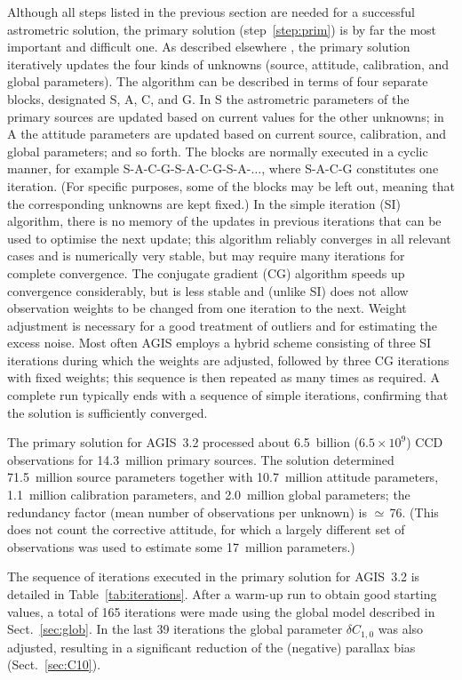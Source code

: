 \documentclass[longauth]{aa} %
\begin{document}
Although all steps listed in the previous section are needed for a successful 
astrometric solution, the primary solution (step~\ref{step:prim}) is by far the most 
important and difficult one. As described elsewhere
, the primary solution iteratively updates the four
kinds of unknowns (source, attitude, calibration, and global parameters). The algorithm
can be described in terms of four separate blocks, designated S, A, C, and G.
In S the astrometric parameters of the primary sources are updated based on current 
values for the other unknowns; in A the attitude parameters are updated based on
current source, calibration, and global parameters; and so forth. The blocks are
normally executed in a cyclic manner, for example S-A-C-G-S-A-C-G-S-A-$\dots$, 
where S-A-C-G constitutes one iteration. (For specific purposes, some of the blocks 
may be left out, meaning that the corresponding unknowns are kept fixed.)
In the simple iteration (SI) algorithm, there is no memory of the updates in previous
iterations that can be used to optimise the next update; this algorithm 
reliably converges in all relevant cases
and is numerically very stable, but may require many iterations for complete convergence. 
The conjugate gradient (CG) algorithm  speeds up 
convergence considerably, but is less stable and (unlike SI) does not allow observation 
weights to be changed from one iteration to the next. Weight adjustment is necessary 
for a good treatment of outliers and for estimating the excess noise. Most often
AGIS employs a hybrid scheme consisting of three SI iterations during which the weights 
are adjusted, followed by three CG iterations with fixed weights; this sequence is 
then repeated as many times as required. A complete run typically ends with a 
sequence of simple iterations, confirming that the solution is sufficiently converged.

The primary solution for AGIS~3.2 processed about 6.5~billion ($6.5\times 10^9$) 
CCD observations for 14.3~million primary sources. The solution determined 
71.5~million source parameters together with 10.7~million attitude parameters, 
1.1~million calibration parameters, and 2.0~million global parameters; the redundancy 
factor (mean number of observations per unknown) is $\simeq\,$76.
(This does not count the corrective attitude, for which a largely different set of
observations was used to estimate some 17~million parameters.)

The sequence of iterations executed in the primary solution for AGIS~3.2 is 
detailed in Table~\ref{tab:iterations}. After a warm-up run to obtain good starting
values, a total of 165 iterations were made using the global model described in 
Sect.~\ref{sec:glob}. In the last 39 iterations the global parameter $\delta C_{1,0}$
was also adjusted, resulting in a significant reduction of the (negative)
parallax bias (Sect.~\ref{sec:C10}).
\end{document}
